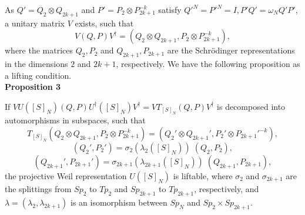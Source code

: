 \documentclass[12pt]{iopart}
\begin{document}
As
\(Q'=Q_2\otimes Q_{2k+1}\) and \(P'=P_2\otimes P_{2k+1}^{-k}\)
satisfy \(Q'^N=P'^N=I,P'Q'=\omega_NQ'P'\), a unitary matrix \(V\) exists, such that
\begin{equation}
V(Q,P)V^\dagger
=(Q_2\otimes Q_{2k+1},P_2\otimes P_{2k+1}^{-k}),
\end{equation}
where the matrices \(Q_2,P_2\) and \(Q_{2k+1},P_{2k+1}\) are the Schr\"odinger representations
in the dimensions \(2\) and \(2k+1\), respectively.
We have the following proposition as a lifting condition.
\\

\noindent
{\bf Proposition 3}
\vspace{2mm}

If \(VU([S]_N)(Q,P)U^\dagger([S]_N)V^\dagger=VT_{[S]_N}(Q,P)V^\dagger\) is decomposed into automorphisms
in subspaces, such that
\begin{equation}
T_{[S]_N}(Q_2\otimes Q_{2k+1},P_2\otimes P_{2k+1}^{-k})
=(Q_2'\otimes Q_{2k+1}',P_2'\otimes P_{2k+1}'^{-k}),
\end{equation}
\begin{equation}
(Q_2',P_2')=\sigma_2(\lambda_2([S]_N))\;(Q_2,P_2),
\end{equation}
\begin{equation}
(Q_{2k+1}',P_{2k+1}')=\sigma_{2k+1}(\lambda_{2k+1}([S]_N))\;(Q_{2k+1},P_{2k+1}),
\end{equation}
the projective Weil representation \(U([S]_N)\) is liftable,
%
where
\(\sigma_2\) and \(\sigma_{2k+1}\) are the splittings from \(Sp_2\) to \(Tp_2\) and \(Sp_{2k+1}\) to \(Tp_{2k+1}\), respectively,
and
\(\lambda=(\lambda_2,\lambda_{2k+1})\) is an isomorphism between
\(Sp_N\) and \(Sp_2\times Sp_{2k+1}\).
\\
\end{document}
